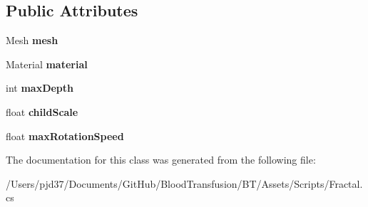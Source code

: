 \subsection*{Public Attributes}
\begin{DoxyCompactItemize}
\item 
Mesh {\bfseries mesh}\hypertarget{class_fractal_abb360563193adf377029b59d5f45f48d}{}\label{class_fractal_abb360563193adf377029b59d5f45f48d}

\item 
Material {\bfseries material}\hypertarget{class_fractal_ab6f661fb0c8a09eba5813c6002232b46}{}\label{class_fractal_ab6f661fb0c8a09eba5813c6002232b46}

\item 
int {\bfseries max\+Depth}\hypertarget{class_fractal_a21467037b0822ee3bb836d28193cfa07}{}\label{class_fractal_a21467037b0822ee3bb836d28193cfa07}

\item 
float {\bfseries child\+Scale}\hypertarget{class_fractal_a329eae1c3d9435b6b7803e3db1184242}{}\label{class_fractal_a329eae1c3d9435b6b7803e3db1184242}

\item 
float {\bfseries max\+Rotation\+Speed}\hypertarget{class_fractal_a74c30a0fc7a0904aeebfda7b8c297997}{}\label{class_fractal_a74c30a0fc7a0904aeebfda7b8c297997}

\end{DoxyCompactItemize}


The documentation for this class was generated from the following file\+:\begin{DoxyCompactItemize}
\item 
/\+Users/pjd37/\+Documents/\+Git\+Hub/\+Blood\+Transfusion/\+B\+T/\+Assets/\+Scripts/Fractal.\+cs\end{DoxyCompactItemize}
